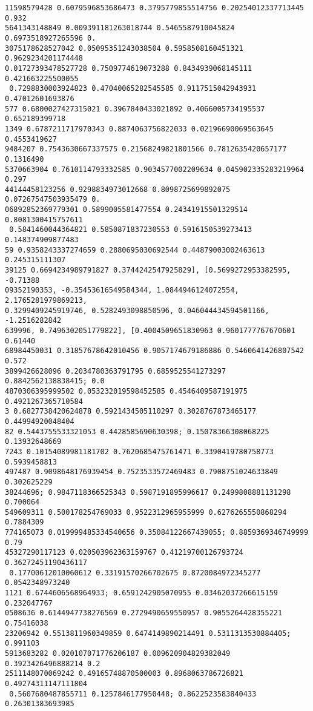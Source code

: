 \documentclass[12pt,a4paper]{article}
\begin{document}
\begin{lstlisting}
11598579428 0.6079596853686473 0.3795779855514756 0.20254012337713445 0.932
5641343148849 0.009391181263018744 0.5465587910045824 0.6973518927265596 0.
3075178628527042 0.05095351243038504 0.5958508160451321 0.9629234201174448 
0.01727393478527728 0.7509774619073288 0.8434939068145111 0.421663225500055
 0.7298830003924823 0.47040065282545585 0.9117515042943931 0.47012601693876
577 0.6800027427315021 0.3967840433021892 0.4066005734195537 0.652189399718
1349 0.6787211717970343 0.8874063756822033 0.02196690069563645 0.4553419627
9484207 0.7543630667337575 0.21568249821801566 0.7812635420657177 0.1316490
5370663904 0.7610114793332585 0.9034577002209634 0.045902335283219964 0.297
44144458123256 0.9298834973012668 0.8098725699892075 0.07267547503935479 0.
06892852369779301 0.5899005581477554 0.24341915501329514 0.8081300415757611
 0.5841460044364821 0.5850871837230553 0.5916150539273413 0.148374909877483
59 0.9358243337274659 0.2880695030692544 0.44879003002463613 0.245315111307
39125 0.6694234989791827 0.3744242547925829], [0.5699272953382595, -0.71388
09352190353, -0.35453616549584344, 1.0844946124072554, 2.1765281979869213, 
0.3299409245919746, 0.5282493098850596, 0.046044434594501166, -1.2516282842
639996, 0.7496302051779822], [0.4004509651830963 0.9601777767670601 0.61440
68984450031 0.31857678642010456 0.9057174679186886 0.5460641426807542 0.572
3899426628096 0.2034780363791795 0.6859525541273297 0.8842562138838415; 0.0
4870306395999502 0.053232019598452585 0.4546409587191975 0.4921267365710584
3 0.6827738420624878 0.5921434505110297 0.3028767873465177 0.44994920048404
82 0.5443755533321053 0.4428585690630398; 0.15078366308068225 0.13932648669
7243 0.10154089981181702 0.7620685475761471 0.3390419780758773 0.5939458813
497487 0.9098648176939454 0.7523533572469483 0.7908751024633849 0.302625229
38244696; 0.9847118366525343 0.5987191895996617 0.2499808881131298 0.700064
549609311 0.500178254769033 0.9522312965955999 0.6276265550868294 0.7884309
774165073 0.019999485334540656 0.35084122667439055; 0.8859369346749999 0.79
45327290117123 0.020503962363159767 0.41219700126793724 0.36272451190436117
 0.17700612010060612 0.33191570266702675 0.8720084972345277 0.0542348973240
1121 0.6744606568964933; 0.6591242905070955 0.03462037266615159 0.232047767
0508636 0.6144947738276569 0.2729490659550957 0.9055264428355221 0.75416038
23206942 0.5513811960349859 0.6474149890214491 0.5311313530884405; 0.991103
5913683282 0.020107071776206187 0.009620904829382049 0.3923426496888214 0.2
2511148070069242 0.49165748870500003 0.8968063786726821 0.49274311147111804
 0.5607680487855711 0.1257846177950448; 0.8622523583840433 0.26301383693985

\end{lstlisting}
\end{document}
